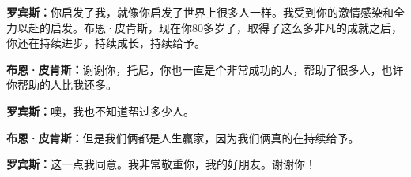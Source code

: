\begin{BookQuote}
\textbf{罗宾斯：}你启发了我，就像你启发了世界上很多人一样。我受到你的激情感染和全力以赴的启发。布恩·皮肯斯，现在你80多岁了，取得了这么多非凡的成就之后，你还在持续进步，持续成长，持续给予。
\end{BookQuote}

\begin{BookQuote}
\textbf{布恩·皮肯斯：}谢谢你，托尼，你也一直是个非常成功的人，帮助了很多人，也许你帮助的人比我还多。
\end{BookQuote}

\begin{BookQuote}
\textbf{罗宾斯：}噢，我也不知道帮过多少人。
\end{BookQuote}

\begin{BookQuote}
\textbf{布恩·皮肯斯：}但是我们俩都是人生赢家，因为我们俩真的在持续给予。
\end{BookQuote}

\begin{BookQuote}
\textbf{罗宾斯：}这一点我同意。我非常敬重你，我的好朋友。谢谢你！
\end{BookQuote}

